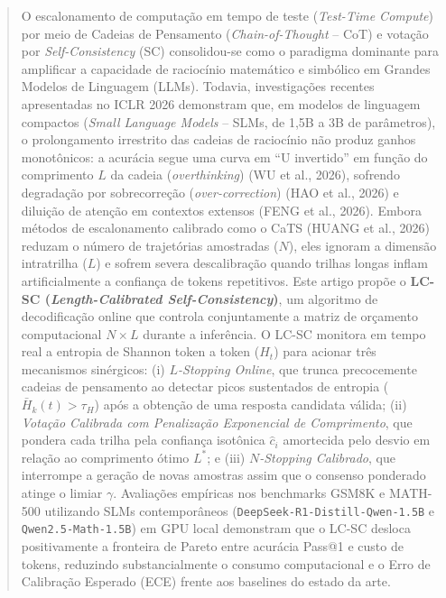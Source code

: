 \documentclass[9pt,conference]{IEEEtran}
\begin{document}
\begin{abstract}
O escalonamento de computa\c{c}\~{a}o em tempo de teste (\textit{Test-Time Compute}) por meio de Cadeias de Pensamento (\textit{Chain-of-Thought} -- CoT) e vota\c{c}\~{a}o por \textit{Self-Consistency} (SC) consolidou-se como o paradigma dominante para amplificar a capacidade de racioc\'{i}nio matem\'{a}tico e simb\'{o}lico em Grandes Modelos de Linguagem (LLMs). Todavia, investiga\c{c}\~{o}es recentes apresentadas no ICLR 2026 demonstram que, em modelos de linguagem compactos (\textit{Small Language Models} -- SLMs, de 1,5B a 3B de par\^{a}metros), o prolongamento irrestrito das cadeias de racioc\'{i}nio n\~{a}o produz ganhos monot\^{o}nicos: a acur\'{a}cia segue uma curva em ``U invertido'' em fun\c{c}\~{a}o do comprimento $L$ da cadeia (\textit{overthinking}) (WU et al., 2026), sofrendo degrada\c{c}\~{a}o por sobrecorre\c{c}\~{a}o (\textit{over-correction}) (HAO et al., 2026) e dilui\c{c}\~{a}o de aten\c{c}\~{a}o em contextos extensos (FENG et al., 2026). Embora m\'{e}todos de escalonamento calibrado como o CaTS (HUANG et al., 2026) reduzam o n\'{u}mero de trajet\'{o}rias amostradas ($N$), eles ignoram a dimens\~{a}o intratrilha ($L$) e sofrem severa descalibra\c{c}\~{a}o quando trilhas longas inflam artificialmente a confian\c{c}a de tokens repetitivos. Este artigo prop\~{o}e o \textbf{LC-SC (\textit{Length-Calibrated Self-Consistency})}, um algoritmo de decodifica\c{c}\~{a}o online que controla conjuntamente a matriz de or\c{c}amento computacional $N \times L$ durante a infer\^{e}ncia. O LC-SC monitora em tempo real a entropia de Shannon token a token ($H_t$) para acionar tr\^{e}s mecanismos sin\'{e}rgicos: (i) \textit{$L$-Stopping Online}, que trunca precocemente cadeias de pensamento ao detectar picos sustentados de entropia ($\bar{H}_k(t) > \tau_H$) ap\'{o}s a obten\c{c}\~{a}o de uma resposta candidata v\'{a}lida; (ii) \textit{Vota\c{c}\~{a}o Calibrada com Penaliza\c{c}\~{a}o Exponencial de Comprimento}, que pondera cada trilha pela confian\c{c}a isot\^{o}nica $\hat{c}_i$ amortecida pelo desvio em rela\c{c}\~{a}o ao comprimento \'{o}timo $L^*$; e (iii) \textit{$N$-Stopping Calibrado}, que interrompe a gera\c{c}\~{a}o de novas amostras assim que o consenso ponderado atinge o limiar $\gamma$. Avalia\c{c}\~{o}es emp\'{i}ricas nos benchmarks GSM8K e MATH-500 utilizando SLMs contempor\^{a}neos (\texttt{DeepSeek-R1-Distill-Qwen-1.5B} e \texttt{Qwen2.5-Math-1.5B}) em GPU local demonstram que o LC-SC desloca positivamente a fronteira de Pareto entre acur\'{a}cia Pass@1 e custo de tokens, reduzindo substancialmente o consumo computacional e o Erro de Calibra\c{c}\~{a}o Esperado (ECE) frente aos baselines do estado da arte.


\end{abstract}
\end{document}

